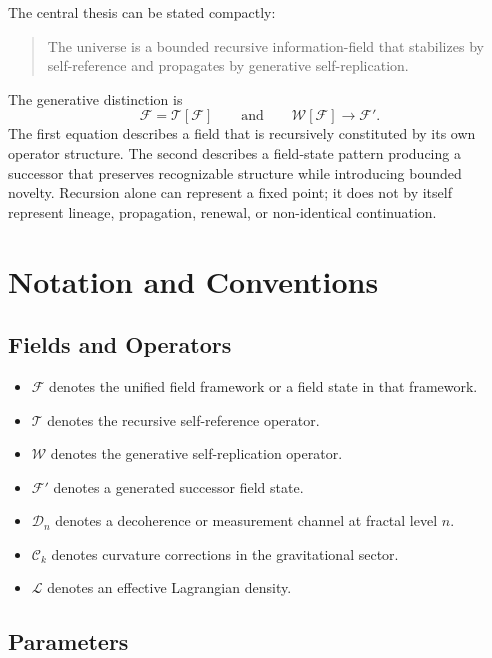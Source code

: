 \documentclass[12pt]{article}
\theoremstyle{remark}
\newcommand{\F}{\mathcal{F}}
\newcommand{\T}{\mathcal{T}}
\newcommand{\W}{\mathcal{W}}
\newcommand{\D}{\mathcal{D}}
\newcommand{\C}{\mathcal{C}}
\newcommand{\Lag}{\mathcal{L}}
\begin{document}
The central thesis can be stated compactly:
\begin{quote}
The universe is a bounded recursive information-field that stabilizes by
self-reference and propagates by generative self-replication.
\end{quote}

The generative distinction is
\begin{equation}
  \F=\T[\F]
  \qquad\text{and}\qquad
  \W[\F]\longrightarrow \F'.
\end{equation}
The first equation describes a field that is recursively constituted by its own
operator structure.  The second describes a field-state pattern producing a
successor that preserves recognizable structure while introducing bounded
novelty.  Recursion alone can represent a fixed point; it does not by itself
represent lineage, propagation, renewal, or non-identical continuation.

\section{Notation and Conventions}

\subsection{Fields and Operators}

\begin{itemize}
  \item $\F$ denotes the unified field framework or a field state in that
  framework.
  \item $\T$ denotes the recursive self-reference operator.
  \item $\W$ denotes the generative self-replication operator.
  \item $\F'$ denotes a generated successor field state.
  \item $\D_n$ denotes a decoherence or measurement channel at fractal level
  $n$.
  \item $\C_k$ denotes curvature corrections in the gravitational sector.
  \item $\Lag$ denotes an effective Lagrangian density.
\end{itemize}

\subsection{Parameters}
\end{document}
